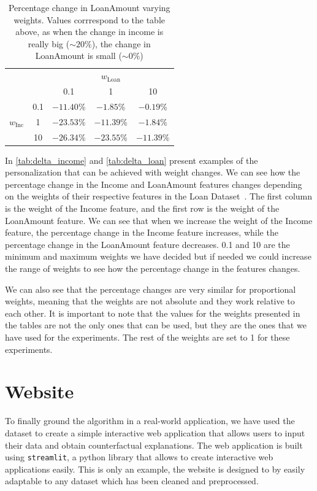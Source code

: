 \documentclass[12pt]{extarticle}
\numberwithin{equation}{section}
\begin{document}
\begin{table}[ht]
    \centering
    \begin{tabular}{cc|ccc}
             &                 & \multicolumn{3}{c}{$w_{\text{Loan}}$} \\
     & & 0.1 & 1 & 10 \\
     \cmidrule(l){1-5}
    \multirow{3}{*}{$w_{\text{Inc}}$}
            & 0.1 & $-11.40$\% &  $-1.85$\% &  $-0.19$\% \\
            & 1   & $-23.53$\% & $-11.39$\% &  $-1.84$\% \\
            & 10  & $-26.34$\% & $-23.55$\% & $-11.39$\% \\
    \bottomrule
\end{tabular}

    \caption{Percentage change in LoanAmount varying weights. Values corrrespond to the table above, as when the change in income is really big ($\sim20\%$), the change in LoanAmount is small ($\sim0\%$)}
    \label{tab:delta_loan}
\end{table}

In \autoref{tab:delta_income} and \autoref{tab:delta_loan} present examples of the personalization that can be achieved with weight changes. We can see how the percentage change in the Income and LoanAmount features changes depending on the weights of their respective features in the Loan Dataset~\cite{kaggleLoan1}. The first column is the weight of the Income feature, and the first row is the weight of the LoanAmount feature. We can see that when we increase the weight of the Income feature, the percentage change in the Income feature increases, while the percentage change in the LoanAmount feature decreases. 0.1 and 10 are the minimum and maximum weights we have decided but if needed we could increase the range of weights to see how the percentage change in the features changes. 

We can also see that the percentage changes are very similar for proportional weights, meaning that the weights are not absolute and they work relative to each other. It is important to note that the values for the weights presented in the tables are not the only ones that can be used, but they are the ones that we have used for the experiments. The rest of the weights are set to 1 for these experiments.

\section{Website}\label{sec:website}
To finally ground the algorithm in a real-world application, we have used the ~\cite{kaggleLoan1} dataset to create a simple interactive web application that allows users to input their data and obtain counterfactual explanations. The web application is built using \texttt{streamlit}, a python library that allows to create interactive web applications easily. This is only an example, the website is designed to by easily adaptable to any dataset which has been cleaned and preprocessed. 
\end{document}
